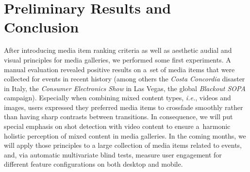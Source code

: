 \documentclass{article}
\let\oldsection\section
\renewcommand{\section}[1]{\oldsection{#1}\vspace{-0.95em}}
\begin{document}
\section{Preliminary Results and Conclusion}
After introducing media item ranking criteria
as well as aesthetic audial and visual principles for media galleries,
we performed some first experiments.
A manual evaluation revealed positive results on a~set of media items
that were collected for events in recent history
(among others the \textit{Costa Concordia} disaster in Italy,
the \textit{Consumer Electronics Show} in Las Vegas,
the global \textit{Blackout SOPA} campaign).
Especially when combining mixed content types, \emph{i.e.}, videos and images,
users expressed they preferred media items to crossfade smoothly
rather than having sharp contrasts between transitions.
In consequence, we will put special emphasis on shot detection with video content
to ensure a~harmonic holistic perception of mixed content in media galleries.
In the coming months, we will apply those principles
to a large collection of media items related to events,
and, via automatic multivariate blind tests, measure user engagement
for different feature configurations on both desktop and mobile.

\let\oldbibitem\bibitem
\renewcommand{\bibitem}[1]{%
	\ifx\bibstarted\undefined
		\def\bibstarted{1}
		\vspace{.1em}
	\else
		\vspace{-.2em plus .1em minus .1em}
	\fi
\oldbibitem{#1}}



\end{document}
